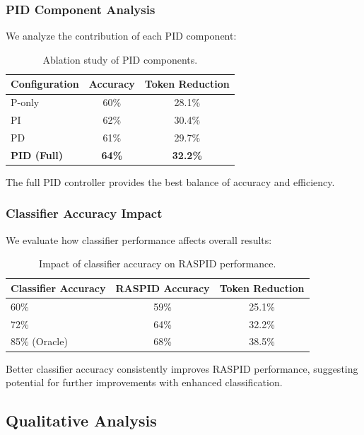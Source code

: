 \documentclass{article}
\begin{document}
\subsubsection{PID Component Analysis}

We analyze the contribution of each PID component:

\begin{table}[ht]
\centering
\begin{tabular}{lcc}
\toprule
Configuration & Accuracy & Token Reduction \\
\midrule
P-only & 60\% & 28.1\% \\
PI & 62\% & 30.4\% \\
PD & 61\% & 29.7\% \\
\textbf{PID (Full)} & \textbf{64\%} & \textbf{32.2\%} \\
\bottomrule
\end{tabular}
\caption{Ablation study of PID components.}
\label{tab:pid_ablation}
\end{table}

The full PID controller provides the best balance of accuracy and efficiency.

\subsubsection{Classifier Accuracy Impact}

We evaluate how classifier performance affects overall results:

\begin{table}[ht]
\centering
\begin{tabular}{lcc}
\toprule
Classifier Accuracy & RASPID Accuracy & Token Reduction \\
\midrule
60\% & 59\% & 25.1\% \\
72\% & 64\% & 32.2\% \\
85\% (Oracle) & 68\% & 38.5\% \\
\bottomrule
\end{tabular}
\caption{Impact of classifier accuracy on RASPID performance.}
\label{tab:classifier_impact}
\end{table}

Better classifier accuracy consistently improves RASPID performance, suggesting potential for further improvements with enhanced classification.

\subsection{Qualitative Analysis}
\end{document}
